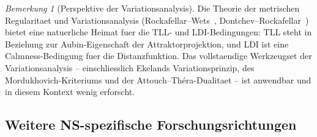 \documentclass[12pt,a4paper]{article}
\theoremstyle{definition}
\theoremstyle{plain}
\theoremstyle{remark}
\newtheorem{remark}[definition]{Bemerkung}
\begin{document}
\begin{remark}[Perspektive der Variationsanalysis]
\label{rem:variational-analysis}
Die Theorie der metrischen Regularitaet und Variationsanalysis (Rockafellar--Wets~\cite{RockafellarWets1998}, Dontchev--Rockafellar~\cite{DontchevRockafellar2009}) bietet eine natuerliche Heimat fuer die TLL- und LDI-Bedingungen: TLL steht in Beziehung zur Aubin-Eigenschaft der Attraktorprojektion, und LDI ist eine Calmness-Bedingung fuer die Distanzfunktion. Das vollstaendige Werkzeugset der Variationsanalysis -- einschliesslich Ekelands Variationsprinzip, des Mordukhovich-Kriteriums und der Attouch--Th\'era-Dualitaet -- ist anwendbar und in diesem Kontext wenig erforscht.
\end{remark}

\subsection{Weitere NS-spezifische Forschungsrichtungen}
\end{document}
